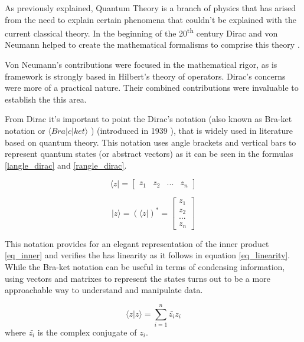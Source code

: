 As previously explained, Quantum Theory is a branch of physics that has arised from the need to explain certain phenomena that couldn't be explained with the current classical theory.
In the beginning of the 20\textsuperscript{th} century Dirac and von Neumann  helped to create the mathematical formalisms to comprise this theory \cite{sep-qt-nvd}\cite{Summers2006}. 

Von Neumann's contributions were focused in the mathematical rigor, as is framework is strongly based in Hilbert's theory of operators. Dirac's concerns were more of a practical nature. Their combined contributions were invaluable to establish the this area. 

From Dirac it's important to point the Dirac's notation (also known as Bra-ket notation or  $\langle Bra\vert c\vert ket\rangle$ ) (introduced in 1939 \cite{sep-qt-nvd}), that is widely used in literature based on quantum theory. This notation uses angle brackets and vertical bars to represent quantum states (or abstract vectors) as it can be seen in the formulas \eqref{langle_dirac} and \eqref{rangle_dirac}. 

\begin{equation}
\label{langle_dirac}
\langle z\vert=\left[\begin{array}{cccc}
z_{1} & z_{2} & ... & z_{n}\end{array}\right]
\end{equation}

\begin{equation}
\label{rangle_dirac}
\vert z\rangle = ( \langle z\vert )^*  =\left[\begin{array}{c}
z_{1}\\
z_{2}\\
...\\
z_{n}
\end{array}\right]
\end{equation}


This notation provides for an elegant representation of the inner product \eqref{eq_inner} and verifies the has linearity as it follows in equation \eqref{eq_linearity}. While the Bra-ket notation can be useful in terms of condensing information, using vectors and matrixes to represent the states turns out to be a more approachable way to understand and manipulate data.
 

\begin{equation}
\label{eq_inner}
\langle z\vert z\rangle={\displaystyle \sum_{i=1}^{n}\bar{z_{i}}z_{i}}
\end{equation}
where $\bar{z_{i}}$ is the complex conjugate of $z_{i}$.


